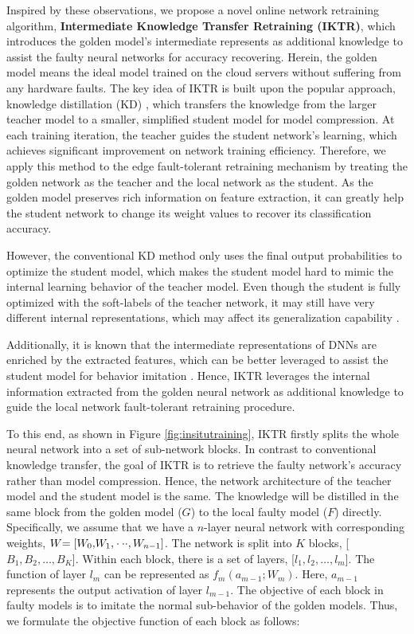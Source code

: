 Inspired by these observations, we propose a novel online network retraining algorithm, {\bf Intermediate Knowledge Transfer Retraining (IKTR)}, which introduces the golden model's intermediate represents as additional knowledge to assist the faulty neural networks for accuracy recovering. Herein, the golden model means the ideal model trained on the cloud servers without suffering from any hardware faults. The key idea of IKTR is built upon the popular approach, knowledge distillation (KD) \cite{44873}, which transfers the knowledge from the larger teacher model to a smaller, simplified student model for model compression. At each training iteration, the teacher guides the student network's learning, which achieves significant improvement on network training efficiency. Therefore, we apply this method to the edge fault-tolerant retraining mechanism by treating the golden network as the teacher and the local network as the student. As the golden model preserves rich information on feature extraction, it can greatly help the student network to change its weight values to recover its classification accuracy.

However, the conventional KD method only uses the final output probabilities to optimize the student model, which makes the student model hard to mimic the internal learning behavior of the teacher model. Even though the student is fully optimized with the soft-labels of the teacher network, it may still have very different internal representations, which may affect its  generalization capability  \cite{DBLP:journals/corr/abs-1910-03723}. 

Additionally, it is known that the intermediate representations of DNNs are enriched by the extracted features, which can be better leveraged to assist the student model for behavior imitation \cite{app9101966}. Hence, IKTR leverages the internal information extracted from the golden neural network as additional knowledge to guide the local network fault-tolerant retraining procedure. 

To this end, as shown in Figure \ref{fig:insitutraining}, IKTR firstly splits the whole neural network into a set of sub-network blocks. In contrast to conventional knowledge transfer, the goal of IKTR is to retrieve the faulty network's accuracy rather than model compression. Hence, the network architecture of the teacher model and the student model is the same. The knowledge will be distilled in the same block from the golden model ($G$) to the local faulty model ($F$) directly. Specifically, we assume that we have a $n$-layer neural network with corresponding weights, $W{\rm{ = [}}{W_0}{\rm{,}} {W_1}{\rm{,}} \cdot  \cdot  \cdot ,{W_{n-1}}{\rm{]}}$. The network is split into $K$ blocks, [$B_1,B_2,\dots,B_K$]. Within each block, there is a set of layers, [$l_1,l_2,\dots,l_m$]. The function of layer $l_m$ can be represented as $f_m({a_{m - 1}};W_m)$. Here, $a_{m-1}$ represents the output activation of layer $l_{m-1}$. The objective of each block in faulty models is to imitate the normal sub-behavior of the golden models.  Thus, we formulate the objective function of each block as follows:

